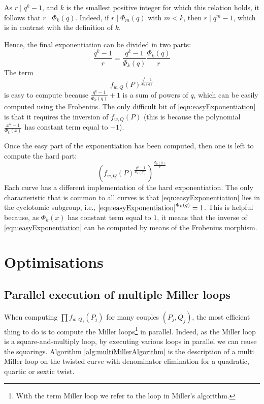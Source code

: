 \documentclass{article}
\theoremstyle{remark}
\theoremstyle{plain}
\begin{document}
As $r \mid q^k - 1$, and $k$ is the smallest positive integer for which this relation holds, it follows that $r \mid \Phi_k(q)$.
Indeed, if $r \mid \Phi_m(q)$ with $m < k$, then $r \mid q^m - 1$, which is in contrast with the definition of $k$.

Hence, the final exponentiation can be divided in two parts:
\[
    \frac{q^k-1}{r} = \frac{q^k-1}{\Phi_k(q)} \frac{\Phi_k(q)}{r}
\]
The term
\begin{equation}
    \label{eqn:easyExponentiation}
    f_{w,Q}(P)^{\frac{q^k-1}{\Phi_k(q)}}
\end{equation}
is easy to compute because $\frac{q^k-1}{\Phi_k(q)} + 1$ is a sum of powers of $q$, which can be easily computed using the Frobenius.
The only difficult bit of \eqref{eqn:easyExponentiation} is that it requires the inversion of $f_{w,Q}(P)$ (this is because the polynomial $\frac{x^k-1}{\Phi_k(x)}$ has constant term equal to $-1$).

Once the easy part of the exponentiation has been computed, then one is left to compute the hard part:
\[
    \left( f_{w,Q}(P)^{\frac{q^k-1}{\Phi_k(q)}} \right)^{\frac{\Phi_k(q)}{r}}
\]
Each curve has a different implementation of the hard exponentiation.
The only characteristic that is common to all curves is that \eqref{eqn:easyExponentiation} lies in the cyclotomic subgroup, i.e., $\eqref{eqn:easyExponentiation}^{\Phi_k(q)} = 1$.
This is helpful because, as $\Phi_k(x)$ has constant term equal to $1$, it means that the inverse of \eqref{eqn:easyExponentiation} can be computed by means of the Frobenius morphism.

\section{Optimisations}

\subsection{Parallel execution of multiple Miller loops}

When computing $\prod f_{w,Q_j}(P_j)$ for many couples $(P_j,Q_j)$, the most efficient thing to do is to compute the Miller loops\footnote{With the term Miller loop we refer to the loop in Miller's algorithm.} in parallel.
Indeed, as the Miller loop is a square-and-multiply loop, by executing various loops in parallel we can reuse the squarings.
Algorithm \ref{alg:multiMillerAlgorithm} is the description of a multi Miller loop on the twisted curve with denominator elimination for a quadratic, quartic or sextic twist.
\end{document}
